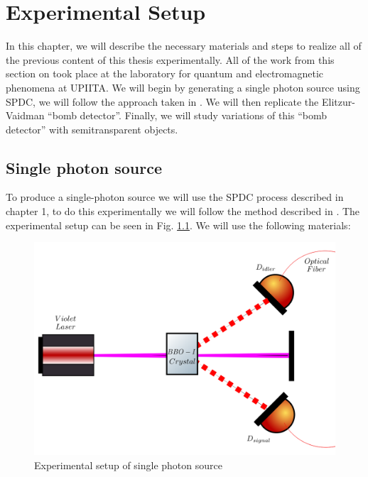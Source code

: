 \documentclass{book}
\begin{document}
\pagebreak







\pagebreak
\chapter{Experimental Setup}
In this chapter, we will describe the necessary materials and steps to realize all of the previous content of this thesis experimentally. All of the work from this section on took place at the laboratory for quantum and electromagnetic phenomena at UPIITA. We will begin by generating a single photon source using SPDC, we will follow the approach taken in \cite{maestria_procopio}. We will then replicate the Elitzur-Vaidman ``bomb detector''. Finally, we will study variations of this ``bomb detector'' with semitransparent objects.

\section{Single photon source}

To produce a single-photon source we will use the SPDC process described in chapter 1, to do this experimentally we will follow the method described in \cite{maestria_procopio}. The experimental setup can be seen in Fig. \ref{single}.  We will use the following materials:

\begin{figure}[!t]
\centering
\includegraphics[width=\linewidth]{images/SPDC_exp.png}
\caption{Experimental setup of single photon source}
\label{single}
\end{figure}
\end{document}
